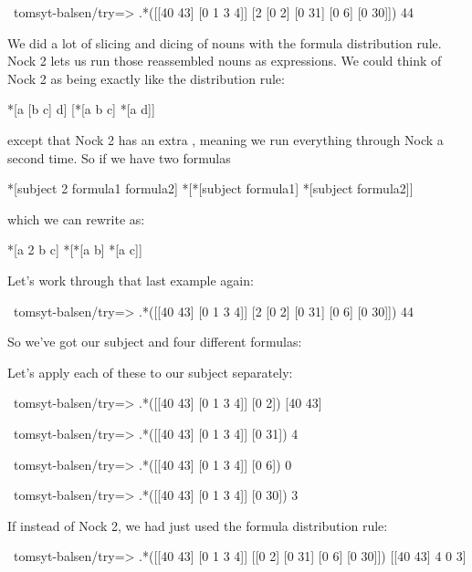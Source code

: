 \begin{code}
~tomsyt-balsen/try=> .*([[40 43] [0 1 3 4]] [2 [0 2] [0 31] [0 6] [0 30]])
44
\end{code}
We did a lot of slicing and dicing of nouns with the formula distribution rule.
Nock 2 lets us run those reassembled nouns as expressions. We could think of
Nock 2 as being exactly like the distribution rule:

\begin{code}
*[a [b c] d]          [*[a b c] *[a d]]
\end{code}
except that Nock 2 has an extra \kode{*}, meaning we run everything through Nock a
second time. So if we have two formulas

\begin{code}
*[subject 2 formula1 formula2]      *[*[subject formula1] *[subject formula2]]
\end{code}
which we can rewrite as:

\begin{code}
*[a 2 b c]            *[*[a b] *[a c]]
\end{code}

Let's work through that last example again:

\begin{code}
~tomsyt-balsen/try=> .*([[40 43] [0 1 3 4]] [2 [0 2] [0 31] [0 6] [0 30]])
44
\end{code}

So we've got our subject \kode{[[40 43] [0 1 3 4]]} and four different formulas:
\kode{[0 2] [0 31] [0 6] [0 30]}

Let's apply each of these to our subject separately:

\begin{code}
~tomsyt-balsen/try=> .*([[40 43] [0 1 3 4]] [0 2])
[40 43]

~tomsyt-balsen/try=> .*([[40 43] [0 1 3 4]] [0 31])
4

~tomsyt-balsen/try=> .*([[40 43] [0 1 3 4]] [0 6])
0

~tomsyt-balsen/try=> .*([[40 43] [0 1 3 4]] [0 30])
3
\end{code}

If instead of Nock 2, we had just used the formula distribution rule:

\begin{code}
~tomsyt-balsen/try=> .*([[40 43] [0 1 3 4]] [[0 2] [0 31] [0 6] [0 30]])
[[40 43] 4 0 3]
\end{code}

